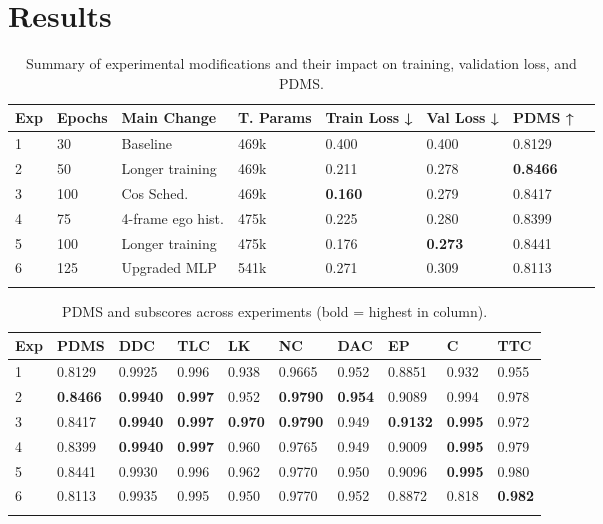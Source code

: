 \documentclass{article}
\begin{document}
\section{Results}
\label{sec:results}

\begin{table}[h]
    \centering
    \setlength{\tabcolsep}{4pt}
    \begin{tabular}{@{}l l l l l l l l@{}}
        \toprule
        \textbf{Exp} & \textbf{Epochs} & \textbf{Main Change} & \textbf{T. Params} & \textbf{Train Loss} ↓ & \textbf{Val Loss} ↓ & \textbf{PDMS} ↑ \\
        \midrule
        1 &  30 & Baseline & 469k & 0.400  & 0.400 & 0.8129 \\
        \midrule
        2 & 50 & Longer training & 469k & 0.211 & 0.278 & \textbf{0.8466} \\
        3 & 100 & Cos Sched.  & 469k & \textbf{0.160} & 0.279 & 0.8417 \\
        \midrule
        4 & 75 & 4-frame ego hist. & 475k & 0.225 & 0.280 & 0.8399 \\
        5 & 100 & Longer training & 475k & 0.176 & \textbf{0.273} & 0.8441 \\
        6 & 125 & Upgraded MLP & 541k & 0.271 & 0.309 & 0.8113 \\
        \bottomrule\\
    \end{tabular}
    \caption{Summary of experimental modifications and their impact on training, validation loss, and PDMS.}
    \label{tab:experiment_summary}
\end{table}


\begin{table}[h]
    \centering
    \begin{tabular}{@{}l l l l l l l l l l@{}}
        \toprule
        \textbf{Exp} & \textbf{PDMS} & \textbf{DDC} & \textbf{TLC} & \textbf{LK} & \textbf{NC} & \textbf{DAC} & \textbf{EP} & \textbf{C} & \textbf{TTC} \\
        \midrule
        1 & 0.8129 & 0.9925 & 0.996 & 0.938 & 0.9665 & 0.952 & 0.8851 & 0.932 & 0.955 \\
        2 & \textbf{0.8466} & \textbf{0.9940} & \textbf{0.997} & 0.952 & \textbf{0.9790} & \textbf{0.954} & 0.9089 & 0.994 & 0.978 \\
        3 & 0.8417 & \textbf{0.9940} & \textbf{0.997} & \textbf{0.970} & \textbf{0.9790} & 0.949 & \textbf{0.9132} & \textbf{0.995} & 0.972 \\
        4 & 0.8399 & \textbf{0.9940} & \textbf{0.997} & 0.960 & 0.9765 & 0.949 & 0.9009 & \textbf{0.995} & 0.979 \\
        5 & 0.8441 & 0.9930 & 0.996 & 0.962 & 0.9770 & 0.950 & 0.9096 & \textbf{0.995} & 0.980 \\
        6 & 0.8113 & 0.9935 & 0.995 & 0.950 & 0.9770 & 0.952 & 0.8872 & 0.818 & \textbf{0.982} \\
        \bottomrule\\
    \end{tabular}
    \caption{PDMS and subscores across experiments (bold = highest in column).}
    \label{tab:pdm_subscores}
\end{table}
\end{document}

